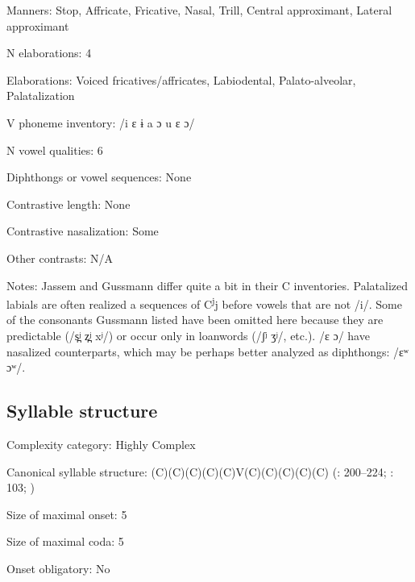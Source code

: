 {\begin{appendixdesc}
\item[Manners:] Stop, Affricate, Fricative, Nasal, Trill, Central approximant, Lateral approximant

\item[N elaborations:] 4

\item[Elaborations:] Voiced fricatives/affricates, Labiodental, Palato-alveolar, Palatalization

\item[V phoneme inventory:] /i ɛ ɨ a ɔ u ɛ ɔ/

\item[N vowel qualities:] 6

\item[Diphthongs or vowel sequences:] None

\item[Contrastive length:] None

\item[Contrastive nasalization:] Some

\item[Other contrasts:] N/A

\item[Notes:] Jassem and Gussmann differ quite a bit in their C inventories. Palatalized labials are often realized a sequences of C\textsuperscript{j}j before vowels that are not /i/. Some of the consonants Gussmann listed have been omitted here because they are predictable (/s̪ʲ z̪ʲ xʲ/) or occur only in loanwords (/ʃʲ ʒʲ/, etc.). /ɛ ɔ/ have nasalized counterparts, which may be perhaps better analyzed as diphthongs: /ɛʷ ɔʷ/.
\end{appendixdesc}
\subsection*{Syllable structure}
\begin{appendixdesc}

\item[Complexity category:] Highly Complex

\item[Canonical syllable structure:] (C)(C)(C)(C)(C)V(C)(C)(C)(C)(C) (\citealt{Gussmann2007}: 200--224; \citealt{Jassem2003}: 103; \citealt{Zydorowicz2010,Bargiełowna1950})

\item[Size of maximal onset:] 5

\item[Size of maximal coda:] 5

\item[Onset obligatory:] No


\end{appendixdesc}}
